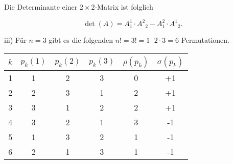 \documentclass[10pt]{article}
\begin{document}
Die Determinante einer $2 \times 2$-Matrix ist folglich


\begin{equation*}
\operatorname{det}(A)=A_{1}^{1} \cdot A^{2}{ }_{2}-A_{1}^{2} \cdot A^{1}{ }_{2} . \tag{6.110}
\end{equation*}


iii) Für $n=3$ gibt es die folgenden $n!=3!=1 \cdot 2 \cdot 3=6$ Permutationen.

\begin{center}
\begin{tabular}{|c|ccc|cc|}
\hline
$k$ & $p_{k}(1)$ & $p_{k}(2)$ & $p_{k}(3)$ & $\rho\left(p_{k}\right)$ & $\sigma\left(p_{k}\right)$ \\
\hline\hline
1 & 1 & 2 & 3 & 0 & +1 \\
2 & 2 & 3 & 1 & 2 & +1 \\
3 & 3 & 1 & 2 & 2 & +1 \\
4 & 3 & 2 & 1 & 3 & -1 \\
5 & 1 & 3 & 2 & 1 & -1 \\
6 & 2 & 1 & 3 & 1 & -1 \\
\hline
\end{tabular}
\end{center}
\end{document}
